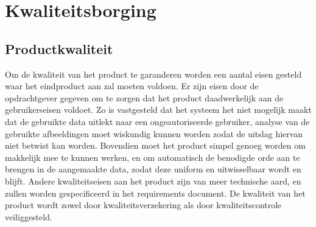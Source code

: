 \section{Kwaliteitsborging}
\label{kwaliteit}







\subsection{Productkwaliteit}
Om de kwaliteit van het product te garanderen worden een aantal eisen gesteld waar het eindproduct aan zal moeten voldoen.
Er zijn eisen door de opdrachtgever gegeven om te zorgen dat het product daadwerkelijk aan de gebruikerseisen voldoet.
Zo is vastgesteld dat het systeem het niet mogelijk maakt dat de gebruikte data uitlekt naar een ongeautoriseerde gebruiker,
analyse van de gebruikte afbeeldingen moet wiskundig kunnen worden zodat de uitslag hiervan niet betwist kan worden.
Bovendien moet het product simpel genoeg worden om makkelijk mee te kunnen werken,
en om automatisch de benodigde orde aan te brengen in de aangemaakte data, zodat deze uniform en uitwisselbaar wordt en blijft.
Andere kwaliteitseisen aan het product zijn van meer technische aard, en zullen worden gespecificeerd in het requirements document. %
De kwaliteit van het product wordt zowel door kwaliteitsverzekering als door kwaliteitscontrole veiliggesteld.


